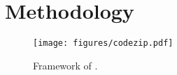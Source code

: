 \section{Methodology}\label{sec:framework}

\begin{figure*}
    \centering
    \texttt{[image: figures/codezip.pdf]}
    \caption{Framework of \ourtool.}
    \label{fig:framework}
    \vspace{-0.3cm}
\end{figure*}

